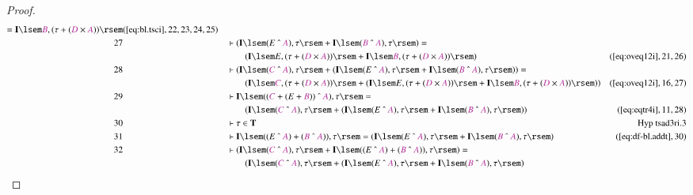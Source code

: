 \begin{proof}
\begin{align}
      = \mathbf{I} \lsem \mc{B} , ( \tau + ( \mc{D} \times
      \mc{A} ) )
      \rsem&(\mbox{\ref{eq:bl.tsci}},22,23,24,25)\notag
  \\ 27 &&  & \vdash ( \mathbf{I} \lsem ( E ~\string^~ \mc{A} ) , \tau \rsem +
      \mathbf{I} \lsem ( \mc{B} ~\string^~ \mc{A} ) , \tau
      \rsem ) =  \notag \\ & & & \qquad
     ( \mathbf{I} \lsem E , ( \tau + ( \mc{D}
      \times \mc{A} ) ) \rsem + \mathbf{I} \lsem \mc{B} , (
      \tau + ( \mc{D} \times \mc{A} ) ) \rsem
      )&(\mbox{\ref{eq:oveq12i}},21,26)\notag
  \\ 28 &&  & \vdash ( \mathbf{I} \lsem ( \mc{C} ~\string^~ \mc{A} ) , \tau
      \rsem + ( \mathbf{I} \lsem ( E ~\string^~ \mc{A} ) ,
      \tau \rsem + \mathbf{I} \lsem ( \mc{B} ~\string^~
      \mc{A} ) , \tau \rsem ) ) =  \notag \\ & & & \qquad
     ( \mathbf{I} \lsem \mc{C}
      , ( \tau + ( \mc{D} \times \mc{A} ) ) \rsem + (
      \mathbf{I} \lsem E , ( \tau + ( \mc{D} \times \mc{A} )
      ) \rsem + \mathbf{I} \lsem \mc{B} , ( \tau + ( \mc{D}
      \times \mc{A} ) ) \rsem )
      )&(\mbox{\ref{eq:oveq12i}},16,27)\notag
  \\ 29 &&  & \vdash \mathbf{I} \lsem ( ( \mc{C} + ( E + \mc{B} ) ) ~\string^~
      \mc{A} ) , \tau \rsem =  \notag \\ & & & \qquad
     ( \mathbf{I} \lsem ( \mc{C}
      ~\string^~ \mc{A} ) , \tau \rsem + ( \mathbf{I} \lsem
      ( E ~\string^~ \mc{A} ) , \tau \rsem + \mathbf{I}
      \lsem ( \mc{B} ~\string^~ \mc{A} ) , \tau \rsem )
      )&(\mbox{\ref{eq:eqtr4i}},11,28)\notag
  \\ 30 &&  & \vdash \tau \in
      \mathbf{T}&\text{Hyp~tsad3ri.3}\notag%
  \\ 31 &&  & \vdash \mathbf{I} \lsem ( ( E ~\string^~ \mc{A} ) + ( \mc{B}
      ~\string^~ \mc{A} ) ) , \tau \rsem = ( \mathbf{I}
      \lsem ( E ~\string^~ \mc{A} ) , \tau \rsem +
      \mathbf{I} \lsem ( \mc{B} ~\string^~ \mc{A} ) , \tau
      \rsem )&(\mbox{\ref{eq:df-bl.addt}},30)\notag
  \\ 32 &&  & \vdash ( \mathbf{I} \lsem ( \mc{C} ~\string^~ \mc{A} ) , \tau
      \rsem + \mathbf{I} \lsem ( ( E ~\string^~ \mc{A} ) +
      ( \mc{B} ~\string^~ \mc{A} ) ) , \tau \rsem ) =  \notag \\ & & & \qquad
     (
      \mathbf{I} \lsem ( \mc{C} ~\string^~ \mc{A} ) , \tau
      \rsem + ( \mathbf{I} \lsem ( E ~\string^~ \mc{A} ) ,
      \tau \rsem + \mathbf{I} \lsem ( \mc{B} ~\string^~
      \mc{A} ) , \tau \rsem )

\end{align}
\end{proof}
